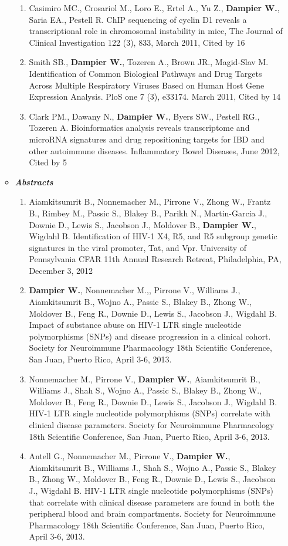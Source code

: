 \documentclass[a4paper,11pt]{article}
\begin{document}
\begin{enumerate}
\begin{itemize}
\begin{enumerate}[label=\arabic{enumii}.]
   \item Casimiro MC., Crosariol M., Loro E., Ertel A., Yu Z., \textbf{Dampier W.}, Saria EA., Pestell R. ChIP sequencing of cyclin D1 reveals a transcriptional role in chromosomal instability in mice, The Journal of Clinical Investigation 122 (3), 833, March 2011, Cited by 16
   \item Smith SB., \textbf{Dampier W.}, Tozeren A., Brown JR., Magid-Slav M. Identification of Common Biological Pathways and Drug Targets Across Multiple Respiratory Viruses Based on Human Host Gene Expression Analysis. PloS one 7 (3), e33174. March 2011, Cited by 14
   \item Clark PM., Dawany N., \textbf{Dampier W.}, Byers SW., Pestell RG., Tozeren A. Bioinformatics analysis reveals transcriptome and microRNA signatures and drug repositioning targets for IBD and other autoimmune diseases. Inflammatory Bowel Diseases, June 2012, Cited by 5
  \end{enumerate}
  \item[] {\Large \bfseries \itshape Abstracts}
  \begin{enumerate}[label=\arabic{enumii}.]
   \item Aiamkitsumrit B., Nonnemacher M., Pirrone V., Zhong W., Frantz B., Rimbey M., Passic S., Blakey B., Parikh N., Martin-Garcia J., Downie D., Lewis S., Jacobson J., Moldover B., \textbf{Dampier W.}, Wigdahl B. Identification of HIV-1 X4, R5, and R5 subgroup genetic signatures in the viral promoter, Tat, and Vpr. University of Pennsylvania CFAR 11th Annual Research Retreat, Philadelphia, PA, December 3, 2012
   \item \textbf{Dampier W.}, Nonnemacher M.,, Pirrone V., Williams J., Aiamkitsumrit B., Wojno A., Passic S., Blakey B., Zhong W., Moldover B., Feng R., Downie D., Lewis S., Jacobson J., Wigdahl B.  Impact of substance abuse on HIV-1 LTR single nucleotide polymorphisms (SNPs) and disease progression in a clinical cohort.  Society for Neuroimmune Pharmacology 18th Scientific Conference, San Juan, Puerto Rico, April 3-6, 2013.
   \item Nonnemacher M., Pirrone V., \textbf{Dampier W.}, Aiamkitsumrit B., Williams J., Shah S., Wojno A., Passic S., Blakey B., Zhong W., Moldover B., Feng R., Downie D., Lewis S., Jacobson J., Wigdahl B.  HIV-1 LTR single nucleotide polymorphisms (SNPs) correlate with clinical disease parameters. Society for Neuroimmune Pharmacology 18th Scientific Conference, San Juan, Puerto Rico, April 3-6, 2013.
   \item Antell G., Nonnemacher M., Pirrone V., \textbf{Dampier W.}, Aiamkitsumrit B., Williams J., Shah S., Wojno A., Passic S., Blakey B., Zhong W., Moldover B., Feng R., Downie D., Lewis S., Jacobson J., Wigdahl B.  HIV-1 LTR single nucleotide polymorphisms (SNPs) that correlate with clinical disease parameters are found in both the peripheral blood and brain compartments.  Society for Neuroimmune Pharmacology 18th Scientific Conference, San Juan, Puerto Rico, April 3-6, 2013.

\end{enumerate}
\end{itemize}
\end{enumerate}
\end{document}
